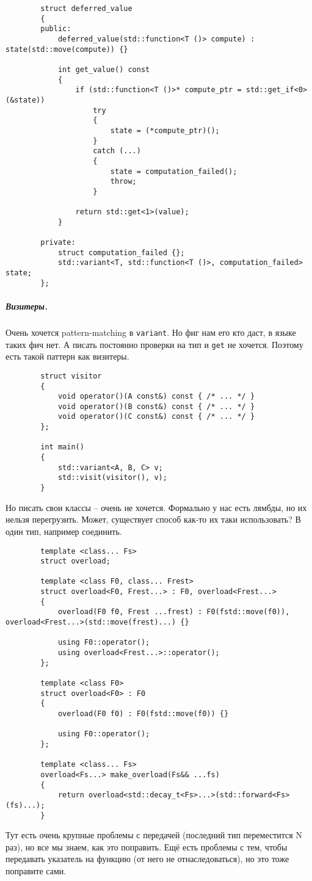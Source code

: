 \documentclass{article}
\begin{document}
    \begin{verbatim}
        struct deferred_value
        {
        public:
            deferred_value(std::function<T ()> compute) : state(std::move(compute)) {}
            
            int get_value() const
            {
                if (std::function<T ()>* compute_ptr = std::get_if<0>(&state))
                    try
                    {
                        state = (*compute_ptr)();
                    }
                    catch (...)
                    {
                        state = computation_failed();
                        throw;
                    }

                return std::get<1>(value);
            }
            
        private:
            struct computation_failed {};
            std::variant<T, std::function<T ()>, computation_failed> state;
        };
    \end{verbatim}
    \subparagraph{Визитеры.}
    Очень хочется pattern-matching в \texttt{variant}. Но фиг нам его кто даст, в языке таких фич нет. А писать постоянно проверки на тип и \texttt{get} не хочется. Поэтому есть такой паттерн как визитеры.
    \begin{verbatim}
        struct visitor
        {
            void operator()(A const&) const { /* ... */ }
            void operator()(B const&) const { /* ... */ }
            void operator()(C const&) const { /* ... */ }
        };

        int main()
        {
            std::variant<A, B, C> v;
            std::visit(visitor(), v);
        }
    \end{verbatim}
    Но писать свои классы -- очень не хочется. Формально у нас есть лямбды, но их нельзя перегрузить. Может, существует способ как-то их таки использовать? В один тип, например соединить.
    \begin{verbatim}
        template <class... Fs>
        struct overload;

        template <class F0, class... Frest>
        struct overload<F0, Frest...> : F0, overload<Frest...>
        {
            overload(F0 f0, Frest ...frest) : F0(fstd::move(f0)), overload<Frest...>(std::move(frest)...) {}

            using F0::operator();
            using overload<Frest...>::operator();
        };

        template <class F0>
        struct overload<F0> : F0
        {
            overload(F0 f0) : F0(fstd::move(f0)) {}
            
            using F0::operator();
        };

        template <class... Fs>
        overload<Fs...> make_overload(Fs&& ...fs)
        {
            return overload<std::decay_t<Fs>...>(std::forward<Fs>(fs)...);
        }
    \end{verbatim}
    Тут есть очень крупные проблемы с передачей (последний тип переместится N раз), но все мы знаем, как это поправить. Ещё есть проблемы с тем, чтобы передавать указатель на функцию (от него не отнаследоваться), но это тоже поправите сами.
\end{document}
